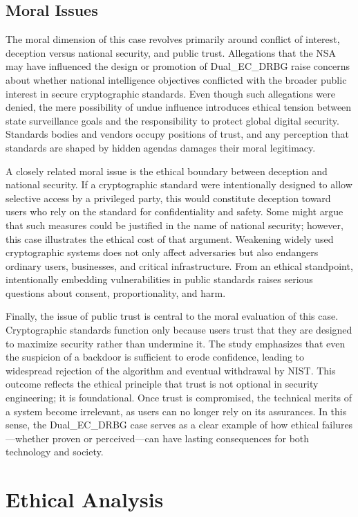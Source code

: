 \documentclass[12pt,letterpaper]{article}
\begin{document}
\subsection{Moral Issues}
The moral dimension of this case revolves primarily around conflict of interest, deception versus national security, and public trust. Allegations that the NSA may have influenced the design or promotion of Dual\_EC\_DRBG raise concerns about whether national intelligence objectives conflicted with the broader public interest in secure cryptographic standards. Even though such allegations were denied, the mere possibility of undue influence introduces ethical tension between state surveillance goals and the responsibility to protect global digital security. Standards bodies and vendors occupy positions of trust, and any perception that standards are shaped by hidden agendas damages their moral legitimacy.

A closely related moral issue is the ethical boundary between deception and national security. If a cryptographic standard were intentionally designed to allow selective access by a privileged party, this would constitute deception toward users who rely on the standard for confidentiality and safety. Some might argue that such measures could be justified in the name of national security; however, this case illustrates the ethical cost of that argument. Weakening widely used cryptographic systems does not only affect adversaries but also endangers ordinary users, businesses, and critical infrastructure. From an ethical standpoint, intentionally embedding vulnerabilities in public standards raises serious questions about consent, proportionality, and harm.

Finally, the issue of public trust is central to the moral evaluation of this case. Cryptographic standards function only because users trust that they are designed to maximize security rather than undermine it. The study emphasizes that even the suspicion of a backdoor is sufficient to erode confidence, leading to widespread rejection of the algorithm and eventual withdrawal by NIST. This outcome reflects the ethical principle that trust is not optional in security engineering; it is foundational. Once trust is compromised, the technical merits of a system become irrelevant, as users can no longer rely on its assurances. In this sense, the Dual\_EC\_DRBG case serves as a clear example of how ethical failures—whether proven or perceived—can have lasting consequences for both technology and society.

\section{Ethical Analysis}
\end{document}
